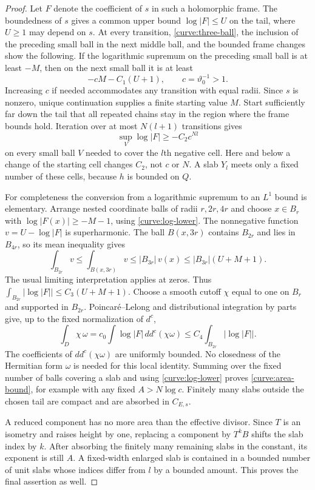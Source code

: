 \begin{proof}
Let $F$ denote the coefficient of $s$ in such a holomorphic frame.
The boundedness of $s$ gives a common upper bound
$\log|F|\le U$ on the tail, where $U\ge1$ may depend on $s$.
At every transition, \eqref{curve:three-ball}, the inclusion of the
preceding small ball in the next middle ball, and the bounded frame
changes show the following.  If the logarithmic supremum on the
preceding small ball is at least $-M$, then on the next small ball it
is at least
\[
 -cM-C_1(U+1),\qquad c=\vartheta_0^{-1}>1.
\]
Increasing $c$ if needed accommodates any transition with equal radii.
Since $s$ is nonzero, unique continuation supplies a finite starting
value $M$.  Start sufficiently far down the tail that all repeated
chains stay in the region where the frame bounds hold.  Iteration over
at most $N(l+1)$ transitions gives
\begin{equation}\label{curve:log-lower}
 \sup_V\log|F|\ge -C_2 c^{Nl}
\end{equation}
on every small ball $V$ needed to cover the $l$th negative cell.
Here and below a change of the starting cell changes $C_2$, not $c$ or
$N$.  A slab $Y_l$ meets only a fixed number of these cells, because
$h$ is bounded on $Q$.

For completeness the conversion from a logarithmic supremum to an
$L^1$ bound is elementary.  Arrange nested coordinate balls of radii
$r,2r,4r$ and choose $x\in B_r$ with
$\log|F(x)|\ge-M-1$, using \eqref{curve:log-lower}.
The nonnegative function $v=U-\log|F|$ is superharmonic.  The ball
$B(x,3r)$ contains $B_{2r}$ and lies in $B_{4r}$, so its mean inequality
gives
\[
 \int_{B_{2r}}v\le \int_{B(x,3r)}v
       \le |B_{3r}|\,v(x)\le |B_{3r}|(U+M+1).
\]
The usual limiting interpretation applies at zeros.  Thus
$\int_{B_{2r}}|\log|F||\le C_3(U+M+1)$.
Choose a smooth cutoff $\chi$ equal to one on $B_r$ and supported in
$B_{2r}$.  Poincar\'e--Lelong
\cite[Chapter~III, (2.15)]{Demailly2012} and distributional integration by parts
give, up to the fixed normalization of $d^c$,
\[
 \int_D\chi\,\omega
 =c_0\int\log|F|\,dd^c(\chi\omega)
 \le C_4\int_{B_{2r}}|\log|F||.
\]
The coefficients of $dd^c(\chi\omega)$ are uniformly bounded.  No
closedness of the Hermitian form $\omega$ is needed for this local
identity.  Summing over the fixed number of balls covering a slab
and using \eqref{curve:log-lower} proves \eqref{curve:area-bound}, for
example with any fixed $A>N\log c$.  Finitely many slabs outside the
chosen tail are compact and are absorbed in $C_{E,s}$.

A reduced component has no more area than the effective divisor.
Since $T$ is an isometry and raises height by one, replacing a component
by $T^kB$ shifts the slab index by $k$.  After absorbing the finitely
many remaining slabs in the constant, its exponent is still $A$.
A fixed-width enlarged slab is contained in a bounded number of unit
slabs whose indices differ from $l$ by a bounded amount.  This proves
the final assertion as well.
\end{proof}


